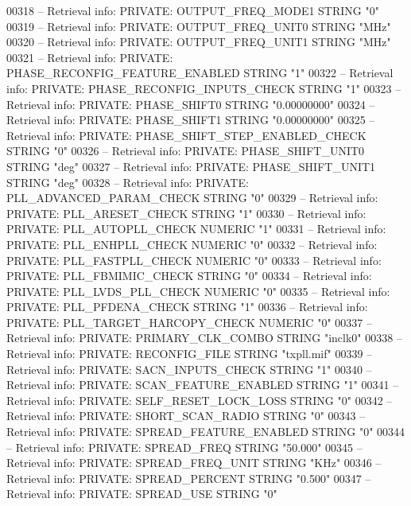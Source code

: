 \begin{DoxyCode}
{00318 \textcolor{keyword}{-- Retrieval info: PRIVATE: OUTPUT\_FREQ\_MODE1 STRING "0"}
00319 \textcolor{keyword}{-- Retrieval info: PRIVATE: OUTPUT\_FREQ\_UNIT0 STRING "MHz"}
00320 \textcolor{keyword}{-- Retrieval info: PRIVATE: OUTPUT\_FREQ\_UNIT1 STRING "MHz"}
00321 \textcolor{keyword}{-- Retrieval info: PRIVATE: PHASE\_RECONFIG\_FEATURE\_ENABLED STRING "1"}
00322 \textcolor{keyword}{-- Retrieval info: PRIVATE: PHASE\_RECONFIG\_INPUTS\_CHECK STRING "1"}
00323 \textcolor{keyword}{-- Retrieval info: PRIVATE: PHASE\_SHIFT0 STRING "0.00000000"}
00324 \textcolor{keyword}{-- Retrieval info: PRIVATE: PHASE\_SHIFT1 STRING "0.00000000"}
00325 \textcolor{keyword}{-- Retrieval info: PRIVATE: PHASE\_SHIFT\_STEP\_ENABLED\_CHECK STRING "0"}
00326 \textcolor{keyword}{-- Retrieval info: PRIVATE: PHASE\_SHIFT\_UNIT0 STRING "deg"}
00327 \textcolor{keyword}{-- Retrieval info: PRIVATE: PHASE\_SHIFT\_UNIT1 STRING "deg"}
00328 \textcolor{keyword}{-- Retrieval info: PRIVATE: PLL\_ADVANCED\_PARAM\_CHECK STRING "0"}
00329 \textcolor{keyword}{-- Retrieval info: PRIVATE: PLL\_ARESET\_CHECK STRING "1"}
00330 \textcolor{keyword}{-- Retrieval info: PRIVATE: PLL\_AUTOPLL\_CHECK NUMERIC "1"}
00331 \textcolor{keyword}{-- Retrieval info: PRIVATE: PLL\_ENHPLL\_CHECK NUMERIC "0"}
00332 \textcolor{keyword}{-- Retrieval info: PRIVATE: PLL\_FASTPLL\_CHECK NUMERIC "0"}
00333 \textcolor{keyword}{-- Retrieval info: PRIVATE: PLL\_FBMIMIC\_CHECK STRING "0"}
00334 \textcolor{keyword}{-- Retrieval info: PRIVATE: PLL\_LVDS\_PLL\_CHECK NUMERIC "0"}
00335 \textcolor{keyword}{-- Retrieval info: PRIVATE: PLL\_PFDENA\_CHECK STRING "1"}
00336 \textcolor{keyword}{-- Retrieval info: PRIVATE: PLL\_TARGET\_HARCOPY\_CHECK NUMERIC "0"}
00337 \textcolor{keyword}{-- Retrieval info: PRIVATE: PRIMARY\_CLK\_COMBO STRING "inclk0"}
00338 \textcolor{keyword}{-- Retrieval info: PRIVATE: RECONFIG\_FILE STRING "txpll.mif"}
00339 \textcolor{keyword}{-- Retrieval info: PRIVATE: SACN\_INPUTS\_CHECK STRING "1"}
00340 \textcolor{keyword}{-- Retrieval info: PRIVATE: SCAN\_FEATURE\_ENABLED STRING "1"}
00341 \textcolor{keyword}{-- Retrieval info: PRIVATE: SELF\_RESET\_LOCK\_LOSS STRING "0"}
00342 \textcolor{keyword}{-- Retrieval info: PRIVATE: SHORT\_SCAN\_RADIO STRING "0"}
00343 \textcolor{keyword}{-- Retrieval info: PRIVATE: SPREAD\_FEATURE\_ENABLED STRING "0"}
00344 \textcolor{keyword}{-- Retrieval info: PRIVATE: SPREAD\_FREQ STRING "50.000"}
00345 \textcolor{keyword}{-- Retrieval info: PRIVATE: SPREAD\_FREQ\_UNIT STRING "KHz"}
00346 \textcolor{keyword}{-- Retrieval info: PRIVATE: SPREAD\_PERCENT STRING "0.500"}
00347 \textcolor{keyword}{-- Retrieval info: PRIVATE: SPREAD\_USE STRING "0"}
}
\end{DoxyCode}

